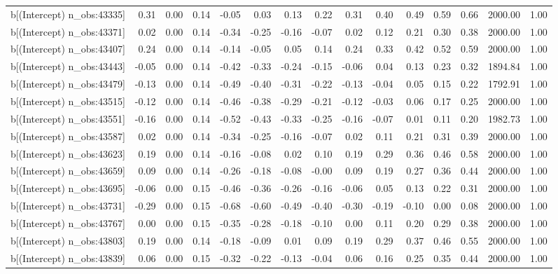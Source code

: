 \begin{table}[ht]
\begin{tabular}{rrrrrrrrrrrrrrr}
  b[(Intercept) n\_obs:43335] & 0.31 & 0.00 & 0.14 & -0.05 & 0.03 & 0.13 & 0.22 & 0.31 & 0.40 & 0.49 & 0.59 & 0.66 & 2000.00 & 1.00 \\ 
  b[(Intercept) n\_obs:43371] & 0.02 & 0.00 & 0.14 & -0.34 & -0.25 & -0.16 & -0.07 & 0.02 & 0.12 & 0.21 & 0.30 & 0.38 & 2000.00 & 1.00 \\ 
  b[(Intercept) n\_obs:43407] & 0.24 & 0.00 & 0.14 & -0.14 & -0.05 & 0.05 & 0.14 & 0.24 & 0.33 & 0.42 & 0.52 & 0.59 & 2000.00 & 1.00 \\ 
  b[(Intercept) n\_obs:43443] & -0.05 & 0.00 & 0.14 & -0.42 & -0.33 & -0.24 & -0.15 & -0.06 & 0.04 & 0.13 & 0.23 & 0.32 & 1894.84 & 1.00 \\ 
  b[(Intercept) n\_obs:43479] & -0.13 & 0.00 & 0.14 & -0.49 & -0.40 & -0.31 & -0.22 & -0.13 & -0.04 & 0.05 & 0.15 & 0.22 & 1792.91 & 1.00 \\ 
  b[(Intercept) n\_obs:43515] & -0.12 & 0.00 & 0.14 & -0.46 & -0.38 & -0.29 & -0.21 & -0.12 & -0.03 & 0.06 & 0.17 & 0.25 & 2000.00 & 1.00 \\ 
  b[(Intercept) n\_obs:43551] & -0.16 & 0.00 & 0.14 & -0.52 & -0.43 & -0.33 & -0.25 & -0.16 & -0.07 & 0.01 & 0.11 & 0.20 & 1982.73 & 1.00 \\ 
  b[(Intercept) n\_obs:43587] & 0.02 & 0.00 & 0.14 & -0.34 & -0.25 & -0.16 & -0.07 & 0.02 & 0.11 & 0.21 & 0.31 & 0.39 & 2000.00 & 1.00 \\ 
  b[(Intercept) n\_obs:43623] & 0.19 & 0.00 & 0.14 & -0.16 & -0.08 & 0.02 & 0.10 & 0.19 & 0.29 & 0.36 & 0.46 & 0.58 & 2000.00 & 1.00 \\ 
  b[(Intercept) n\_obs:43659] & 0.09 & 0.00 & 0.14 & -0.26 & -0.18 & -0.08 & -0.00 & 0.09 & 0.19 & 0.27 & 0.36 & 0.44 & 2000.00 & 1.00 \\ 
  b[(Intercept) n\_obs:43695] & -0.06 & 0.00 & 0.15 & -0.46 & -0.36 & -0.26 & -0.16 & -0.06 & 0.05 & 0.13 & 0.22 & 0.31 & 2000.00 & 1.00 \\ 
  b[(Intercept) n\_obs:43731] & -0.29 & 0.00 & 0.15 & -0.68 & -0.60 & -0.49 & -0.40 & -0.30 & -0.19 & -0.10 & 0.00 & 0.08 & 2000.00 & 1.00 \\ 
  b[(Intercept) n\_obs:43767] & 0.00 & 0.00 & 0.15 & -0.35 & -0.28 & -0.18 & -0.10 & 0.00 & 0.11 & 0.20 & 0.29 & 0.38 & 2000.00 & 1.00 \\ 
  b[(Intercept) n\_obs:43803] & 0.19 & 0.00 & 0.14 & -0.18 & -0.09 & 0.01 & 0.09 & 0.19 & 0.29 & 0.37 & 0.46 & 0.55 & 2000.00 & 1.00 \\ 
  b[(Intercept) n\_obs:43839] & 0.06 & 0.00 & 0.15 & -0.32 & -0.22 & -0.13 & -0.04 & 0.06 & 0.16 & 0.25 & 0.35 & 0.44 & 2000.00 & 1.00 \\ 

\end{tabular}
\end{table}
